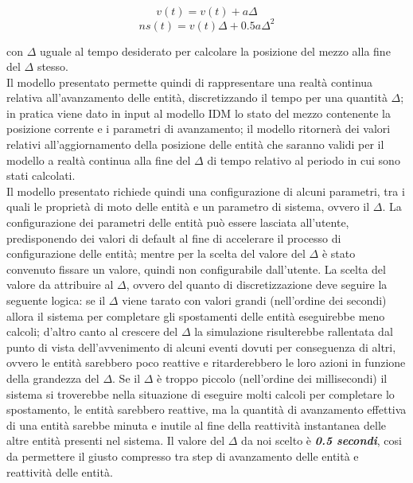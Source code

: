 \begin{equation}
v(t)= v(t)+a\Delta
\end{equation}
\begin{equation}
ns(t)= v(t)\Delta+0.5a\Delta^2
\end{equation}

con $\Delta$ uguale al tempo desiderato per calcolare la posizione del mezzo alla fine del $\Delta$ stesso. \\
Il modello presentato permette quindi di rappresentare una realtà continua relativa all'avanzamento delle entità, discretizzando il tempo per una quantità $\Delta$; in pratica viene dato in input al modello \ac{IDM} lo stato del mezzo contenente la posizione corrente e i parametri di avanzamento; il modello ritornerà dei valori relativi all'aggiornamento della posizione delle entità che saranno validi per il modello a realtà continua alla fine del $\Delta$ di tempo relativo al periodo in cui sono stati calcolati.\\
Il modello presentato richiede quindi una configurazione di alcuni parametri, tra i quali le proprietà di moto delle entità e un parametro di sistema, ovvero il $\Delta$. La configurazione dei parametri delle entità può essere lasciata all'utente, predisponendo dei valori di default al fine di accelerare il processo di configurazione delle entità; mentre per la scelta del valore del $\Delta$ è stato convenuto fissare un valore, quindi non configurabile dall'utente. La scelta del valore da attribuire al $\Delta$, ovvero del quanto di discretizzazione deve seguire la seguente logica: se il $\Delta$ viene tarato con valori grandi (nell'ordine dei secondi) allora il sistema per completare gli spostamenti delle entità eseguirebbe meno calcoli; d'altro canto al crescere del $\Delta$ la simulazione risulterebbe rallentata dal punto di vista dell'avvenimento di alcuni eventi dovuti per conseguenza di altri, ovvero le entità sarebbero poco reattive e ritarderebbero le loro azioni in funzione della grandezza del $\Delta$. Se il $\Delta$ è troppo piccolo (nell'ordine dei millisecondi) il sistema si troverebbe nella situazione di eseguire molti calcoli per completare lo spostamento, le entità sarebbero reattive, ma la quantità di avanzamento effettiva di una entità sarebbe minuta e inutile al fine della reattività instantanea delle altre entità presenti nel sistema. Il valore del $\Delta$ da noi scelto è \textbf{\textit{0.5 secondi}}, cosi da permettere il giusto compresso tra step di avanzamento delle entità e reattività delle entità. 
